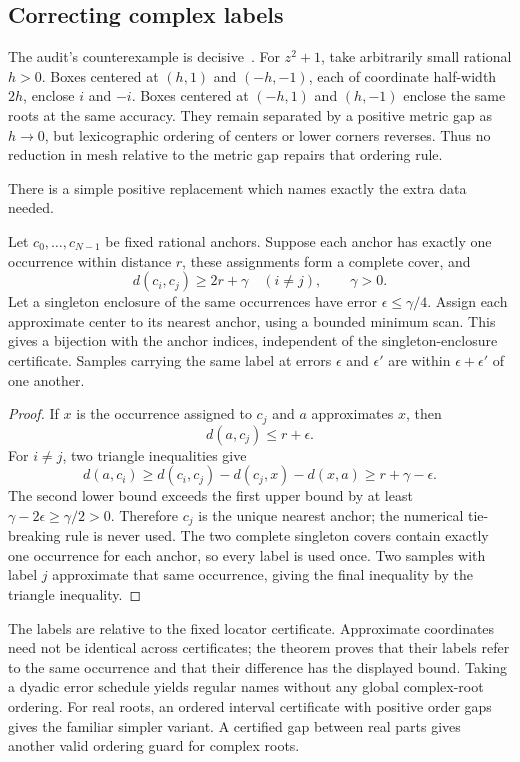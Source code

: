 \subsection{Correcting complex labels}

The audit's counterexample is decisive~\cite{repo-fiber}.  For $z^2+1$, take
arbitrarily small rational $h>0$.  Boxes centered at $(h,1)$ and $(-h,-1)$,
each of coordinate half-width $2h$, enclose $i$ and $-i$.  Boxes centered at
$(-h,1)$ and $(h,-1)$ enclose the same roots at the same accuracy.  They
remain separated by a positive metric gap as $h\to0$, but lexicographic
ordering of centers or lower corners reverses.  Thus no reduction in mesh
relative to the metric gap repairs that ordering rule.

There is a simple positive replacement which names exactly the extra data
needed.

\begin{theorem}
\label{thm:stable-locators}
Let $c_0,\ldots,c_{N-1}$ be fixed rational anchors.  Suppose each anchor
has exactly one occurrence within distance $r$, these assignments form a
complete cover, and
\[
                 d(c_i,c_j)\geq2r+\gamma
                 \quad(i\ne j),\qquad \gamma>0.
\]
Let a singleton enclosure of the same occurrences have error
$\epsilon\leq\gamma/4$.  Assign each approximate center to its nearest
anchor, using a bounded minimum scan.  This gives a bijection with the
anchor indices, independent of the singleton-enclosure certificate.
Samples carrying the same label at errors $\epsilon$ and $\epsilon'$ are
within $\epsilon+\epsilon'$ of one another.
\end{theorem}
\begin{proof}
If $x$ is the occurrence assigned to $c_j$ and $a$ approximates $x$, then
\[
                     d(a,c_j)\leq r+\epsilon.
\]
For $i\ne j$, two triangle inequalities give
\[
 d(a,c_i)\geq d(c_i,c_j)-d(c_j,x)-d(x,a)
             \geq r+\gamma-\epsilon.
\]
The second lower bound exceeds the first upper bound by at least
$\gamma-2\epsilon\geq\gamma/2>0$.  Therefore $c_j$ is the unique nearest
anchor; the numerical tie-breaking rule is never used.  The two complete
singleton covers contain exactly one occurrence for each anchor, so every
label is used once.  Two samples with label $j$ approximate that same
occurrence, giving the final inequality by the triangle inequality.
\end{proof}

The labels are relative to the fixed locator certificate.  Approximate
coordinates need not be identical across certificates; the theorem proves
that their labels refer to the same occurrence and that their difference has
the displayed bound.  Taking a dyadic error schedule yields regular names
without any global complex-root ordering.  For real roots, an ordered
interval certificate with positive order gaps gives the familiar simpler
variant.  A certified gap between real parts gives another valid ordering
guard for complex roots.

